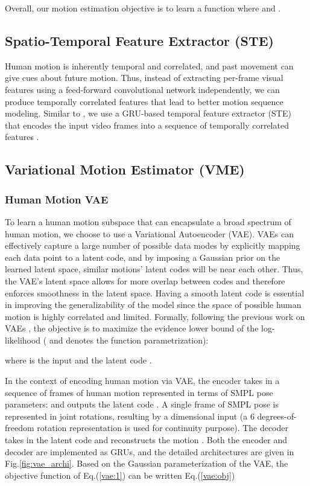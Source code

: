 \documentclass[runningheads]{llncs}
\begin{document}
Overall, our motion estimation objective is to learn a function  where  and   .









\subsection{Spatio-Temporal Feature Extractor (STE)}
Human motion is inherently temporal and correlated, and past movement can give cues about future motion. Thus, instead of extracting per-frame visual features using a feed-forward convolutional network independently, we can produce temporally correlated features that lead to better motion sequence modeling. Similar to \cite{vibe}, we use a GRU-based temporal feature extractor (STE) that encodes the input video frames  into a sequence of temporally correlated features . 

\subsection{Variational Motion Estimator (VME)}
\label{compact}
\subsubsection{Human Motion VAE}

To learn a human motion subspace that can encapsulate a broad spectrum of human motion, we choose to use a Variational Autoencoder (VAE). VAEs can effectively capture a large number of possible data modes by explicitly mapping each data point to a latent code, and by imposing a Gaussian prior on the learned latent space, similar motions' latent codes will be near each other. Thus, the VAE's latent space allows for more overlap between codes and therefore enforces smoothness in the latent space. Having a smooth latent code is essential in improving the generalizability of the model since the space of possible human motion is highly correlated and limited. Formally, following the previous work on VAEs  \cite{diverse,Kingma2014,Walker2017,Walker2017}, the objective is to maximize the evidence lower bound of the log-likelihood  ( and  denotes the function parametrization): 


where  is the input and the latent code .

In the context of encoding human motion via VAE, the encoder  takes in a sequence of  frames of human motion represented in terms of SMPL pose parameters:  and outputs the latent code . A single frame of SMPL pose is represented in joint rotations, resulting by a  dimensional input (a 6 degrees-of-freedom rotation representation\cite{rotrep} is used for continuity purpose). The decoder  takes in the latent code  and reconstructs the motion . Both the encoder  and decoder  are implemented as GRUs, and the detailed architectures are given in Fig.\ref{fig:vae_archi}. Based on the Gaussian parameterization of the VAE, the objective function of Eq.(\ref{vae:1}) can be written Eq.(\ref{vae:obj}) 
\end{document}
